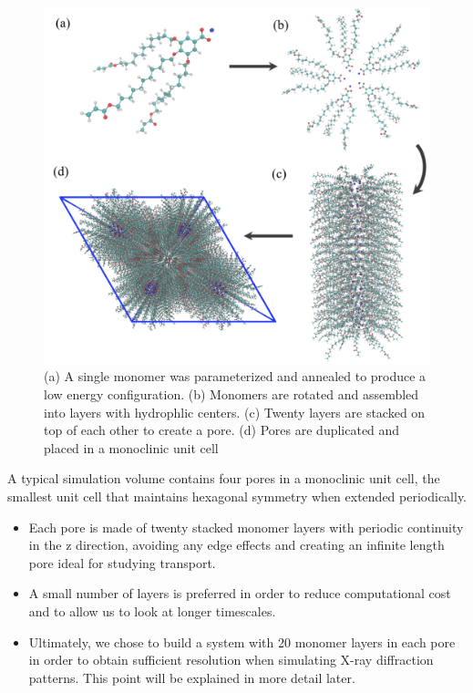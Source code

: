 \documentclass{article}
\begin{document}
  \begin{figure}[H]
	\centering
	\includegraphics[width=0.75\linewidth]{build.PNG} %
	\caption{(a) A single monomer was parameterized and annealed to produce a low energy
		configuration. (b) Monomers are rotated and assembled into layers with 
		hydrophlic centers. (c) Twenty layers are stacked on top of each other to create
		a pore. (d) Pores are duplicated and placed in a monoclinic unit cell}\label{fig:python}
  \end{figure}
  
  A typical simulation volume contains four pores in a monoclinic unit cell,
  the smallest unit cell that maintains hexagonal symmetry when extended 
  periodically.
  \begin{itemize}
    \item Each pore is made of twenty stacked monomer layers with periodic 
    continuity in the z direction, avoiding any edge effects and creating an 
    infinite length pore ideal for studying transport.
    \item A small number of layers is preferred in order to reduce computational
    cost and to allow us to look at longer timescales.
    \item Ultimately, we chose to build a system with 20 monomer layers in each pore
    in order to obtain sufficient resolution when simulating X-ray diffraction patterns.
    This point will be explained in more detail later.
  \end{itemize}
  
\end{document}
